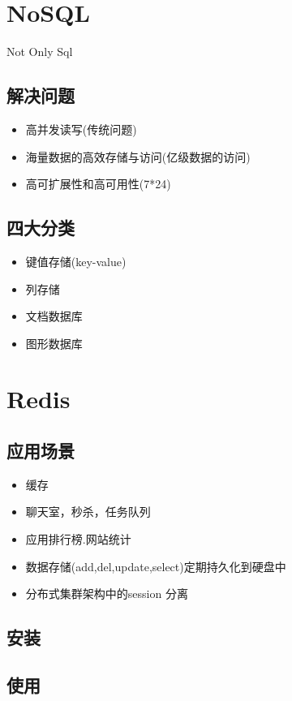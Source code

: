 \documentclass[UTF8,a4paper,8pt]{ctexbook}
\begin{document}
	\section{NoSQL} Not Only Sql
		\subsection{解决问题}
			\begin{itemize}
				\item 高并发读写(传统问题)
				\item 海量数据的高效存储与访问(亿级数据的访问)
				\item 高可扩展性和高可用性(7*24)
			\end{itemize}
		
		\subsection{四大分类}
			\begin{itemize}
				\item 键值存储(key-value)
				\item 列存储
				\item 文档数据库
				\item 图形数据库
			\end{itemize}
	
	\section{Redis}
		\subsection{应用场景}
			\begin{itemize}
				\item 缓存
				\item 聊天室，秒杀，任务队列
				\item 应用排行榜.网站统计
				\item 数据存储(add,del,update,select)定期持久化到硬盘中
				\item 分布式集群架构中的session 分离
			\end{itemize}
		\subsection{安装}
		 
		\subsection{使用}
		
\end{document}
